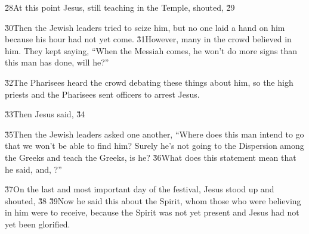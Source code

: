 \v{28}At this point Jesus, still teaching in the Temple, shouted,  \v{29}\red{,}

\v{30}Then the Jewish leaders tried to seize him, but no one laid a hand on him because his hour had not yet come. \v{31}However, many in the crowd believed in him. They kept saying, ``When the Messiah comes, he won't do more signs than this man has done, will he?''

\v{32}The Pharisees heard the crowd debating these things about him, so the high priests and the Pharisees sent officers to arrest Jesus.

\v{33}Then Jesus said,  \v{34} 

\v{35}Then the Jewish leaders asked one another, ``Where does this man intend to go that we won't be able to find him? Surely he's not going to the Dispersion among the Greeks and teach the Greeks, is he? \v{36}What does this statement mean that he said,  and, ?''

\v{37}On the last and most important day of the festival, Jesus stood up and shouted,   \v{38} \v{39}Now he said this about the Spirit, whom those who were believing in him were to receive, because the Spirit was not yet present and Jesus had not yet been glorified.

